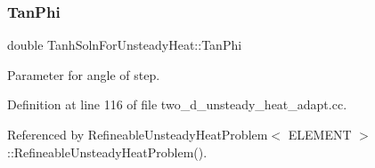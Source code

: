 \mbox{\label{namespaceTanhSolnForUnsteadyHeat_af8d2e06630e8a3f71d1f8dbeecf8a964}} 
\subsubsection{\texorpdfstring{Tan\+Phi}{TanPhi}}
{\footnotesize\ttfamily double Tanh\+Soln\+For\+Unsteady\+Heat\+::\+Tan\+Phi}



Parameter for angle of step. 



Definition at line 116 of file two\+\_\+d\+\_\+unsteady\+\_\+heat\+\_\+adapt.\+cc.



Referenced by Refineable\+Unsteady\+Heat\+Problem$<$ E\+L\+E\+M\+E\+N\+T $>$\+::\+Refineable\+Unsteady\+Heat\+Problem().

